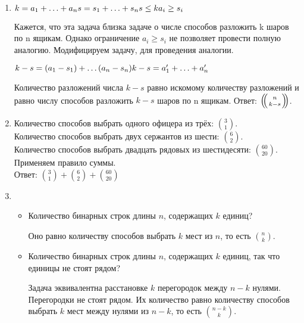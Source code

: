 \documentclass{article}
\def\multiset#1#2{
    \ensuremath{\left(\kern-.3em\left(\genfrac{}{}{0pt}{}{#1}{#2}\right)\kern-.3em\right)}
}
\begin{document}
\begin{enumerate}
\begin{itemize}
\item 

\end{itemize}

\item 

$
k = a_1 + \ldots + a_n\\
s = s_1 + \ldots + s_n\\
s \leq k\\
a_i \geq s_i
$

Кажется, что эта задача близка задаче о числе способов разложить k шаров по n
ящикам. Однако ограничение $a_i \geq s_i$ не позволяет провести полную
аналогию. Модифицируем задачу, для проведения аналогии.

$k - s = (a_1 - s_1) + \ldots (a_n - s_n)\\
k - s = a'_1 + \ldots + a'_n$

Количество разложений числа $k - s$ равно искомому количеству разложений и
равно числу способов разложить $k - s$ шаров по n ящикам.
Ответ: $\multiset{n}{k - s}$.

\item Количество способов выбрать одного офицера из трёх: ${3 \choose 1}$.\\
Количество способов выбрать двух сержантов из шести: ${6 \choose 2}$.\\
Количество способов выбрать двадцать рядовых из шестидесяти: ${60 \choose 20}$.\\
Применяем правило суммы.\\
Ответ: ${3 \choose 1} + {6 \choose 2} + {60 \choose 20}$ 

\item 

\begin{itemize}

\item Количество бинарных строк длины $n$, содержащих $k$ единиц?

Оно равно количеству способов выбрать $k$ мест из $n$, то есть ${n \choose k}$.

\item Количество бинарных строк длины $n$, содержащих $k$ единиц, так что
единицы не стоят рядом?

Задача эквивалентна расстановке $k$ перегородок между $n - k$ нулями.
Перегородки не стоят рядом. Их количество равно количеству способов выбрать $k$
мест между нулями из $n - k$, то есть ${n - k \choose k}$.

\end{itemize}


\end{enumerate}
\end{document}
